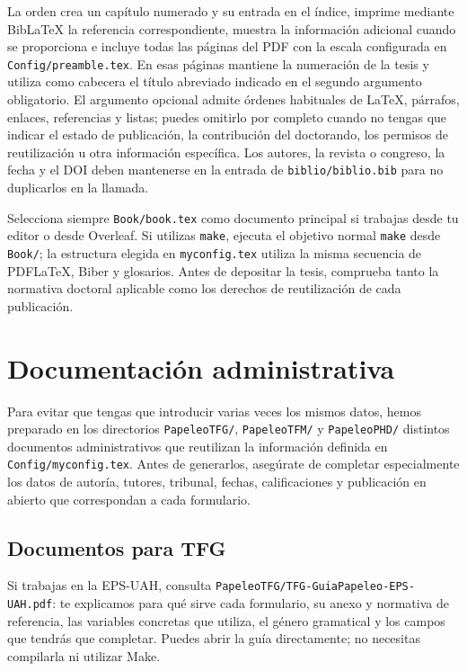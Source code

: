 La orden crea un capítulo numerado y su entrada en el índice, imprime mediante BibLaTeX la referencia correspondiente, muestra la información adicional cuando se proporciona e incluye todas las páginas del PDF con la escala configurada en \texttt{Config/preamble.tex}. En esas páginas mantiene la numeración de la tesis y utiliza como cabecera el título abreviado indicado en el segundo argumento obligatorio. El argumento opcional admite órdenes habituales de \LaTeX{}, párrafos, enlaces, referencias y listas; puedes omitirlo por completo cuando no tengas que indicar el estado de publicación, la contribución del doctorando, los permisos de reutilización u otra información específica. Los autores, la revista o congreso, la fecha y el DOI deben mantenerse en la entrada de \texttt{biblio/biblio.bib} para no duplicarlos en la llamada.

Selecciona siempre \texttt{Book/book.tex} como documento principal si trabajas desde tu editor o desde Overleaf. Si utilizas \texttt{make}, ejecuta el objetivo normal \texttt{make} desde \texttt{Book/}; la estructura elegida en \texttt{myconfig.tex} utiliza la misma secuencia de PDFLaTeX, Biber y glosarios. Antes de depositar la tesis, comprueba tanto la normativa doctoral aplicable como los derechos de reutilización de cada publicación.

\section{Documentación administrativa}
\label{sec:introapp1}

Para evitar que tengas que introducir varias veces los mismos datos, hemos preparado en los directorios \texttt{PapeleoTFG/}, \texttt{PapeleoTFM/} y \texttt{PapeleoPHD/} distintos documentos administrativos que reutilizan la información definida en \texttt{Config/myconfig.tex}. Antes de generarlos, asegúrate de completar especialmente los datos de autoría, tutores, tribunal, fechas, calificaciones y publicación en abierto que correspondan a cada formulario.

\subsection{Documentos para TFG}

Si trabajas en la EPS-UAH, consulta \texttt{PapeleoTFG/TFG-GuiaPapeleo-EPS-UAH.pdf}: te explicamos para qué sirve cada formulario, su anexo y normativa de referencia, las variables concretas que utiliza, el género gramatical y los campos que tendrás que completar. Puedes abrir la guía directamente; no necesitas compilarla ni utilizar Make.

